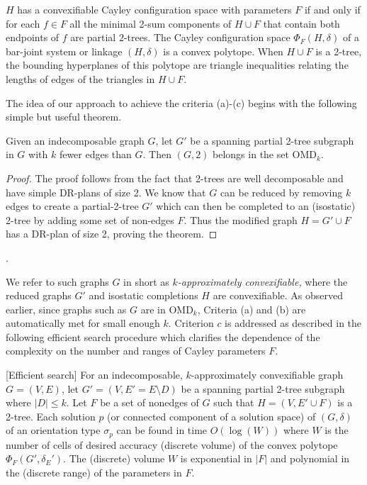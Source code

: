 \begin{theorem}
    \label{convexcayley}
    \cite{XX}
    $H$ has a convexifiable Cayley configuration space  with parameters $F$
    if and only if for each $f\in F$  all the minimal 2-sum components
    of $H\cup F$ that contain both endpoints of $f$ are partial 2-trees.
    The Cayley configuration space $\Phi_F(H,\delta)$
    of a bar-joint system or linkage $(H,\delta)$ is a convex polytope.
    When $H\cup F$ is a 2-tree, the
    bounding hyperplanes of this polytope are triangle inequalities
    relating the lengths of edges of the triangles in $H\cup F$.
\end{theorem}

The idea of our approach to achieve the criteria
(a)-(c) begins with the following simple but useful theorem.

\begin{theorem}
    \label{omdk}
Given an indecomposable graph $G$,
let $G'$ be a spanning partial 2-tree subgraph in $G$ with
$k$ fewer edges than $G$.
Then  $(G,2)$ belongs in the set OMD$_k$.
\end{theorem}

\begin{proof}
The proof follows from the fact that 2-trees are well decomposable and have
simple DR-plans of size 2.
We know that $G$ can be reduced
by removing $k$ edges to create a partial-2-tree $G'$
which can then be completed to an (isostatic) 2-tree by adding some set of non-edges
$F$. Thus the modified graph $H = G'\cup F$ has  a DR-plan of size 2, proving the theorem.
\end{proof}.

We refer to such graphs $G$ in short as {\em $k$-approximately
convexifiable,} where the reduced graphs $G'$ and isostatic completions $H$
are convexifiable.
As observed earlier, since graphs such as $G$ are in OMD$_k$, Criteria (a) and (b)
are automatically met for small enough $k$.
Criterion $c$ is addressed
as described in the following efficient search procedure
which clarifies the dependence of the complexity on the number and ranges  of Cayley
parameters $F$.

\begin{theorem}
    \label{criterionc}
    [Efficient search]
    For an indecomposable, $k$-approximately convexifiable graph $G =
    (V,E)$,
   let $G' = (V,E' =E\setminus D)$ be a spanning partial 2-tree subgraph
    where $|D| \le  k$. Let  $F$ be a set of nonedges of $G$ such that
    $H = (V, E'\cup F)$ is a 2-tree.
    Each solution $p$ (or connected component of a solution space)
    of $(G,\delta)$
    of an orientation type $\sigma_p$ can be found in time $O(\log(W))$ where
    $W$ is the number of cells of desired accuracy (discrete volume) of
    the convex
    polytope $\Phi_F(G',\delta_E')$.  The (discrete) volume $W$ is exponential in
    $|F|$ and polynomial in the (discrete range) of the parameters in $F$.
\end{theorem}


